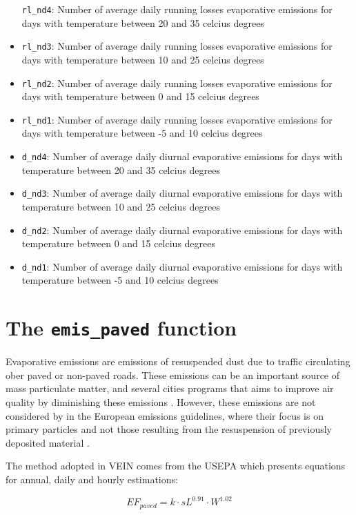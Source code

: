 \documentclass[12pt,graybox,envcountchap,sectrefs]{krantz}
\theoremstyle{definition}
\theoremstyle{definition}
\theoremstyle{definition}
\theoremstyle{remark}
\begin{document}
\begin{itemize}
  \texttt{rl\_nd4}: Number of average daily running losses evaporative
  emissions for days with temperature between 20 and 35 celcius degrees
\item
  \texttt{rl\_nd3}: Number of average daily running losses evaporative
  emissions for days with temperature between 10 and 25 celcius degrees
\item
  \texttt{rl\_nd2}: Number of average daily running losses evaporative
  emissions for days with temperature between 0 and 15 celcius degrees
\item
  \texttt{rl\_nd1}: Number of average daily running losses evaporative
  emissions for days with temperature between -5 and 10 celcius degrees
\item
  \texttt{d\_nd4}: Number of average daily diurnal evaporative emissions
  for days with temperature between 20 and 35 celcius degrees
\item
  \texttt{d\_nd3}: Number of average daily diurnal evaporative emissions
  for days with temperature between 10 and 25 celcius degrees
\item
  \texttt{d\_nd2}: Number of average daily diurnal evaporative emissions
  for days with temperature between 0 and 15 celcius degrees
\item
  \texttt{d\_nd1}: Number of average daily diurnal evaporative emissions
  for days with temperature between -5 and 10 celcius degrees
\end{itemize}

\section{\texorpdfstring{The \texttt{emis\_paved}
function}{The emis\_paved function}}\label{the-emis_paved-function}

Evaporative emissions are emissions of resuspended dust due to traffic
circulating ober paved or non-paved roads. These emissions can be an
important source of mass particulate matter, and several cities programs
that aims to improve air quality by diminishing these emissions
\citep{AMATO20103070}. However, these emissions are not considered by in
the European emissions guidelines, where their focus is on primary
particles and not those resulting from the resuspension of previously
deposited material \citep{NtziachristosBoulter2009}.

The method adopted in VEIN comes from the USEPA \citep{paved} which
presents equations for annual, daily and hourly estimations:

\begin{equation}
EF_{paved}=k \cdot sL^{0.91} \cdot W^{1.02}
\label{eq:res1}
\end{equation}
\end{document}
